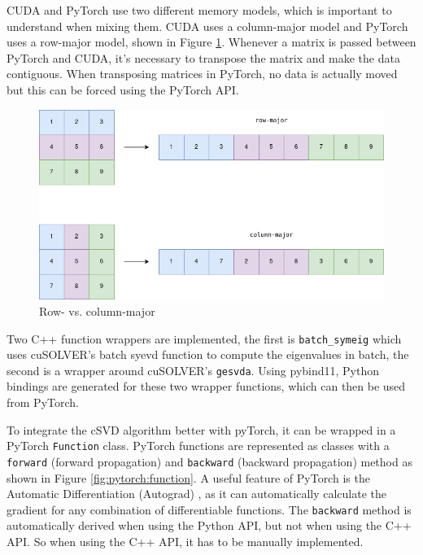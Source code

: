 CUDA and PyTorch use two different memory models, which is important to understand when mixing them. CUDA uses a column-major model and PyTorch uses a row-major model, shown in Figure \ref{fig:rowcol}. Whenever a matrix is passed between PyTorch and CUDA, it's necessary to transpose the matrix and make the data contiguous. When transposing matrices in PyTorch, no data is actually moved but this can be forced using the PyTorch API.

\begin{figure}[H]
    \centering
    \includegraphics[scale=0.45]{Figures/major.png}
    \caption{Row- vs. column-major}
    \label{fig:rowcol}
  \end{figure}

  Two C++ function wrappers are implemented, the first is \texttt{batch\_symeig} which uses cuSOLVER's batch syevd function to compute the eigenvalues in batch, the second is a wrapper around cuSOLVER's \texttt{gesvda}. Using pybind11, Python bindings are generated for these two wrapper functions, which can then be used from PyTorch.


  To integrate the cSVD algorithm better with pyTorch, it can be wrapped in a PyTorch \texttt{Function} class. PyTorch functions are represented as classes with a \texttt{forward} (forward propagation) and \texttt{backward} (backward propagation) method as shown in Figure \ref{fig:pytorch:function}. A useful feature of PyTorch is the Automatic Differentiation (Autograd) \cite{pytorch:documentation}, as it can automatically calculate the gradient for any combination of differentiable functions. The \texttt{backward} method is automatically derived when using the Python API, but not when using the C++ API. So when using the C++ API, it has to be manually implemented.

